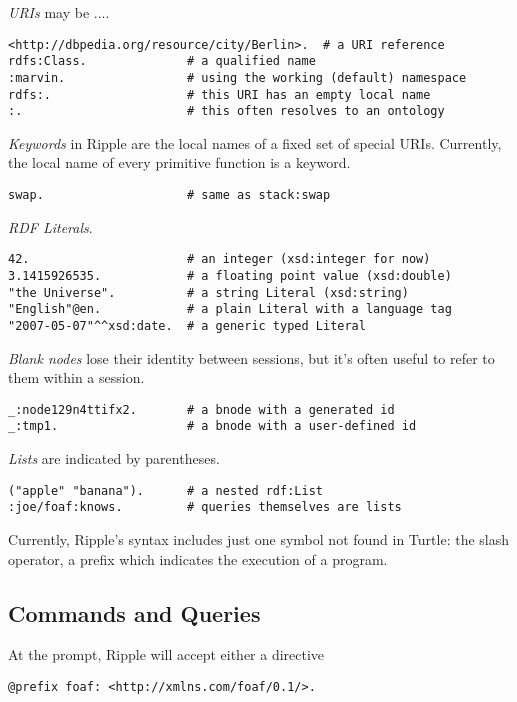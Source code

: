 \documentclass[runningheads]{llncs}
\begin{document}
\textit{URIs} may be ....
\begin{verbatim}
<http://dbpedia.org/resource/city/Berlin>.  # a URI reference
rdfs:Class.              # a qualified name
:marvin.                 # using the working (default) namespace
rdfs:.                   # this URI has an empty local name
:.                       # this often resolves to an ontology
\end{verbatim}
\textit{Keywords} in Ripple are the local names of a fixed set of special URIs.  Currently, the local name of every primitive function is a keyword.
\begin{verbatim}
swap.                    # same as stack:swap
\end{verbatim}
\textit{RDF Literals}.
\begin{verbatim}
42.                      # an integer (xsd:integer for now)
3.1415926535.            # a floating point value (xsd:double)
"the Universe".          # a string Literal (xsd:string)
"English"@en.            # a plain Literal with a language tag
"2007-05-07"^^xsd:date.  # a generic typed Literal
\end{verbatim}
\textit{Blank nodes} lose their identity between sessions, but it's often useful to refer to them within a session.
\begin{verbatim}
_:node129n4ttifx2.       # a bnode with a generated id
_:tmp1.                  # a bnode with a user-defined id
\end{verbatim}
\textit{Lists} are indicated by parentheses.
\begin{verbatim}
("apple" "banana").      # a nested rdf:List
:joe/foaf:knows.         # queries themselves are lists
\end{verbatim}

Currently, Ripple's syntax includes just one symbol not found in Turtle: the slash operator, a prefix which indicates the execution of a program.






\subsection{Commands and Queries}


At the prompt, Ripple will accept either a directive

\begin{verbatim}
@prefix foaf: <http://xmlns.com/foaf/0.1/>.
\end{verbatim}
\end{document}

